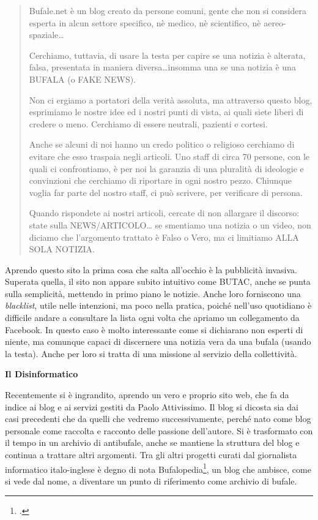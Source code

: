 \documentclass{article}
\begin{document}
\begin{quote} 
Bufale.net è un blog creato da persone comuni, gente che non si considera esperta in alcun settore specifico, nè medico, nè scientifico, nè aereo-spaziale…

Cerchiamo, tuttavia, di usare la testa per capire se una notizia è alterata, falsa, presentata in maniera diversa…insomma una se una notizia è una BUFALA (o FAKE NEWS).

Non ci ergiamo a portatori della verità assoluta, ma attraverso questo blog, esprimiamo le nostre idee ed i nostri punti di vista, ai quali siete liberi di credere o meno.
Cerchiamo di essere neutrali, pazienti e cortesi.

Anche se alcuni di noi hanno un credo politico o religioso cerchiamo di evitare che esso traspaia negli articoli. Uno staff di circa 70 persone, con le quali ci confrontiamo, è per noi la garanzia di una pluralità di ideologie e convinzioni che cerchiamo di riportare in ogni nostro pezzo. Chiunque voglia far parte del nostro staff, ci può scrivere, per verificare di persona.

Quando rispondete ai nostri articoli, cercate di non allargare il discorso: state sulla NEWS/ARTICOLO… se smentiamo una notizia o un video, non diciamo che l’argomento trattato è Falso o Vero, ma ci limitiamo ALLA SOLA NOTIZIA.
\end{quote}

Aprendo questo sito la prima cosa che salta all’occhio è la pubblicità invasiva. Superata quella, il sito non appare subito intuitivo come BUTAC, anche se punta sulla semplicità, mettendo in primo piano le notizie. Anche loro forniscono una \textit{blacklist}, utile nelle intenzioni, ma poco nella pratica, poiché nell’uso quotidiano è difficile andare a consultare la lista ogni volta che apriamo un collegamento da Facebook.
In questo caso è molto interessante come si dichiarano non esperti di niente, ma comunque capaci di discernere una notizia vera da una bufala (usando la testa). Anche per loro si tratta di una missione al servizio della collettività.

\vspace{0.5 cm}

\textbf{Il Disinformatico}

Recentemente si è ingrandito, aprendo un vero e proprio sito web, che fa da indice ai blog e ai servizi gestiti da Paolo Attivissimo. Il blog si dicosta sia dai casi precedenti che da quelli che vedremo successivamente, perché nato come blog personale come raccolta e racconto delle passione dell’autore. Si è trasformato con il tempo in un archivio di antibufale, anche se mantiene la struttura del blog e continua a trattare altri argomenti. Tra gli altri progetti curati dal giornalista informatico italo-inglese è degno di nota Bufalopedia\footcite{attivissimo_bufalopedia:_nodate}, un blog che ambisce, come si vede dal nome, a diventare un punto di riferimento come archivio di bufale.
\end{document}
